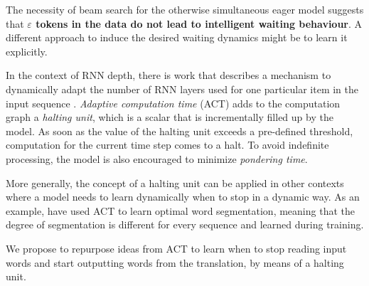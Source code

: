 \documentclass[english]{uzhpub}
\begin{document}
The necessity of beam search for the otherwise simultaneous eager model suggests that \textbf{$\varepsilon$ tokens in the data do not lead to intelligent waiting behaviour}. A different approach to induce the desired waiting dynamics might be to learn it explicitly.

In the context of RNN depth, there is work that describes a mechanism to dynamically adapt the number of RNN layers used for one particular item in the input sequence \cite{act.graves2016adaptive}. \textit{Adaptive computation time} (ACT) adds to the computation graph a \textit{halting unit}, which is a scalar that is incrementally filled up by the model. As soon as the value of the halting unit exceeds a pre-defined threshold, computation for the current time step comes to a halt. To avoid indefinite processing, the model is also encouraged to minimize \textit{pondering time}.

More generally, the concept of a halting unit can be applied in other contexts where a model needs to learn dynamically when to stop in a dynamic way. As an example, \cite{kreutzer2018c} have used ACT to learn optimal word segmentation, meaning that the degree of segmentation is different for every sequence and learned during training.

We propose to repurpose ideas from ACT to learn when to stop reading input words and start outputting words from the translation, by means of a halting unit.





\end{document}
